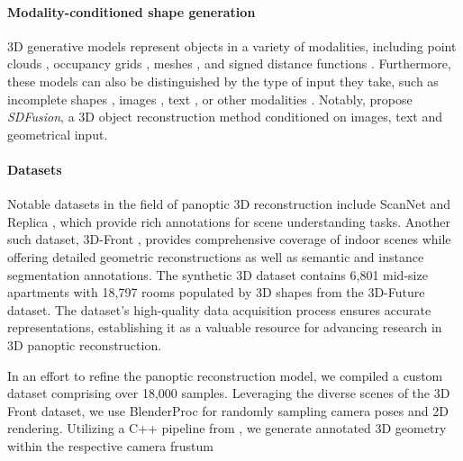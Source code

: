 \paragraph{Modality-conditioned shape generation}
3D generative models represent objects in a variety of modalities, including point clouds \citep{achlioptas2018learning, luo2021diffusion}, occupancy grids \citep{mescheder2019occupancy}, meshes \citep{mo2019structurenet}, and signed distance functions \citep{park2019deepsdf}.
Furthermore, these models can also be distinguished by the type of input they take, such as incomplete shapes \citep{dai2017shape}, images \citep{fan2017point}, text \citep{liu2022towards, zhao2023michelangelo}, or other modalities \citep{Zhou_2021_CVPR}. 
Notably, \citet{cheng2023sdfusion} propose \emph{SDFusion}, a 3D object reconstruction method conditioned on images, text and geometrical input.

\paragraph{Datasets}
Notable datasets in the field of panoptic 3D reconstruction include ScanNet \citep{dai2017scannet} and Replica \citep{straub2019replica}, which provide rich annotations for scene understanding tasks.
Another such dataset, 3D-Front \citep{fu20213d}, provides comprehensive coverage of indoor scenes while offering detailed geometric reconstructions as well as semantic and instance segmentation annotations.
The synthetic 3D dataset contains 6,801 mid-size apartments with 18,797 rooms populated by 3D shapes from the 3D-Future \citep{fu20213e} dataset. The dataset's high-quality data acquisition process ensures accurate representations, establishing it as a valuable resource for advancing research in 3D panoptic reconstruction. 

In an effort to refine the panoptic reconstruction model, we compiled a custom dataset comprising over 18,000 samples. Leveraging the diverse scenes of the 3D Front dataset, we use BlenderProc \citep{Denninger2023} for randomly sampling camera poses and 2D rendering. Utilizing a C++ pipeline from \citet{dahnert2021panoptic}, we generate annotated 3D geometry within the respective camera frustum